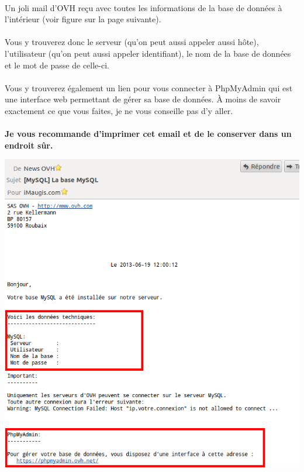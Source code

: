 \documentclass[10pt,a4paper]{article}
\begin{document}
\paragraph{}Un joli mail d'OVH reçu avec toutes les informations de la base de données à l'intérieur (voir figure sur la page suivante).
\paragraph{}Vous y trouverez donc le serveur (qu'on peut aussi appeler aussi hôte), l'utilisateur (qu'on peut aussi appeler identifiant), le nom de la base de données et le mot de passe de celle-ci.
\paragraph{}Vous y trouverez également un lien pour vous connecter à PhpMyAdmin qui est une interface web permettant de gérer sa base de données. À moins de savoir exactement ce que vous faites, je ne vous conseille pas d'y aller.
\paragraph{}\begin{center}\textbf{Je vous recommande d'imprimer cet email et de le conserver dans un endroit sûr.}\end{center}
\begin{center}
\includegraphics[scale=0.35]{img/0295.png}
\end{center}
\end{document}
